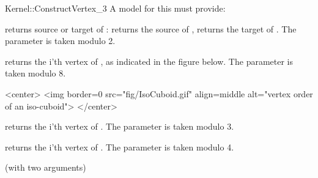 \begin{ccRefFunctionObjectConcept}{Kernel::ConstructVertex_3}
A model for this must provide:


 {returns source or target of : \ccVar{}
  returns the source of , \ccVar{} returns the target
  of . The parameter  is taken modulo 2. }

 {returns the i'th vertex of
  , as indicated in the figure below. The parameter  is
  taken modulo 8. 
  }

\begin{ccHtmlOnly}
<center>
<img border=0 src="fig/IsoCuboid.gif" align=middle 
  alt="vertex order of an iso-cuboid">
</center>
\end{ccHtmlOnly} 

 {returns the i'th vertex of . The parameter
   is taken modulo 3.}

 {returns the i'th vertex of
  . The parameter  is taken modulo 4.}

\ccRefines
{} (with two arguments)

\ccSeeAlso
{} \\
 \\
  \\
 \\

\end{ccRefFunctionObjectConcept}
